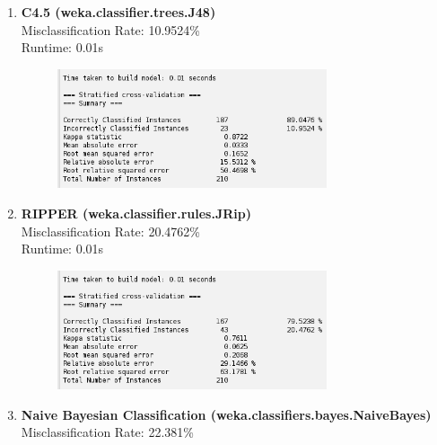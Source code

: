 \documentclass{article}
\begin{document}
    \begin{enumerate}[label = (\alph*), left=10pt, itemsep=10pt]
        
        \item \begin{minipage}[t]{0.9\textwidth}
            \textbf{C4.5 (weka.classifier.trees.J48)}\\
             Misclassification Rate: 10.9524\%\\
             Runtime: 0.01s
             \begin{figure}[H]
                \includegraphics[width=0.75\textwidth, height=0.2\textheight]{./83a.png}
            \end{figure}
        \end{minipage}
        \item \begin{minipage}[t]{0.9\textwidth}
            \textbf{RIPPER (weka.classifier.rules.JRip)}\\
             Misclassification Rate: 20.4762\%\\
             Runtime: 0.01s
             \begin{figure}[H]
                \includegraphics[width=0.75\textwidth, height=0.2\textheight]{./83b.png}
            \end{figure}
        \end{minipage}
        \item \begin{minipage}[t]{0.9\textwidth}
            \textbf{Naive Bayesian Classification (weka.classifiers.bayes.NaiveBayes)}\\
             Misclassification Rate: 22.381\%\\

\end{minipage}
\end{enumerate}
\end{document}
